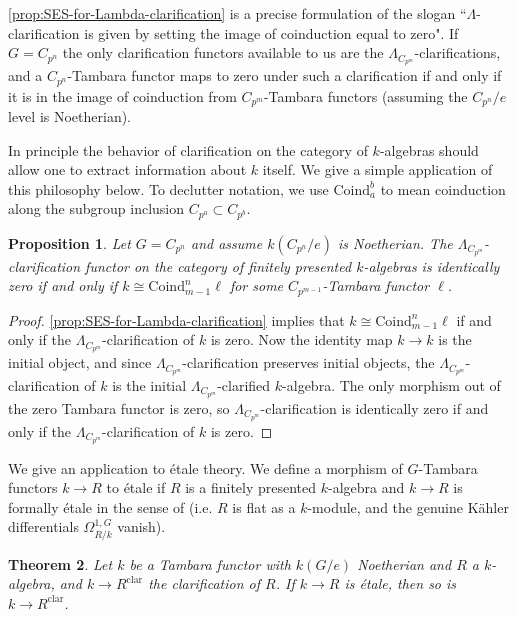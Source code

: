 \documentclass[11pt,dvipsnames]{amsart}
\newtheorem{theorem}{Theorem}[section]
\newtheorem{proposition}[theorem]{Proposition}
\theoremstyle{BoldRemark}
\begin{document}
\cref{prop:SES-for-Lambda-clarification} is a precise formulation of the slogan ``$\Lambda$-clarification is given by setting the image of coinduction equal to zero". If $G = C_{p^n}$ the only clarification functors available to us are the $\Lambda_{C_{p^m}}$-clarifications, and a $C_{p^n}$-Tambara functor maps to zero under such a clarification if and only if it is in the image of coinduction from $C_{p^m}$-Tambara functors (assuming the $C_{p^n}/e$ level is Noetherian). 

In principle the behavior of clarification on the category of $k$-algebras should allow one to extract information about $k$ itself. We give a simple application of this philosophy below. To declutter notation, we use $\mathrm{Coind}_a^b$ to mean coinduction along the subgroup inclusion $C_{p^a} \subset C_{p^b}$.

\begin{proposition}
	Let $G = C_{p^n}$ and assume $k(C_{p^n}/e)$ is Noetherian. The $\Lambda_{C_{p^m}}$-clarification functor on the category of finitely presented $k$-algebras is identically zero if and only if $k \cong \mathrm{Coind}_{m-1}^n \ell$ for some $C_{p^{m-1}}$-Tambara functor $\ell$.
\end{proposition}

\begin{proof}
	\cref{prop:SES-for-Lambda-clarification} implies that $k \cong \mathrm{Coind}_{m-1}^n \ell$ if and only if the $\Lambda_{C_{p^m}}$-clarification of $k$ is zero. Now the identity map $k \rightarrow k$ is the initial object, and since $\Lambda_{C_{p^m}}$-clarification preserves initial objects, the $\Lambda_{C_{p^m}}$-clarification of $k$ is the initial $\Lambda_{C_{p^m}}$-clarified $k$-algebra. The only morphism out of the zero Tambara functor is zero, so $\Lambda_{C_{p^m}}$-clarification is identically zero if and only if the $\Lambda_{C_{p^m}}$-clarification of $k$ is zero.
\end{proof}

We give an application to \'{e}tale theory. We define a morphism of $G$-Tambara functors $k \rightarrow R$ to \'{e}tale if $R$ is a finitely presented $k$-algebra and $k \rightarrow R$ is formally \'{e}tale in the sense of \cite{Hil17} (i.e. $R$ is flat as a $k$-module, and the genuine K\"{a}hler differentials $\Omega^{1,G}_{R/k}$ vanish).

\begin{theorem}\label{thm:clarification-of-etale-is-etale}
	Let $k$ be a Tambara functor with $k(G/e)$ Noetherian and $R$ a $k$-algebra, and $k \rightarrow R^{\mathrm{clar}}$ the clarification of $R$. If $k \rightarrow R$ is \'{e}tale, then so is $k \rightarrow R^{\mathrm{clar}}$.
\end{theorem}
\end{document}
